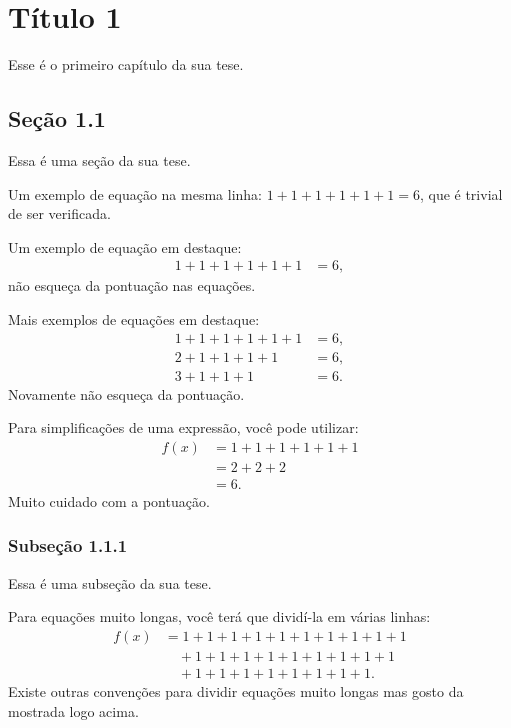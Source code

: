 \chapter{T\'itulo 1}
Esse \'e o primeiro cap\'itulo da sua tese.

\section{Se\c c\~ao 1.1}
Essa \'{e} uma se\c{c}\~{a}o da sua tese.

Um exemplo de equa\c{c}\~{a}o na mesma linha: 
$ 1 + 1 + 1 + 1 + 1 + 1 = 6$, 
que \'{e} trivial de ser verificada.

Um exemplo de equa\c{c}\~{a}o em destaque:
\begin{align*}
1 + 1 + 1 + 1 + 1 + 1 &= 6,
\end{align*}
n\~{a}o esque\c{c}a da pontua\c{c}\~{a}o nas equa\c{c}\~{o}es.

Mais exemplos de equa\c{c}\~{o}es em destaque:
\begin{align*}
1 + 1 + 1 + 1 + 1 + 1 &= 6, \\
2 + 1 + 1 + 1 + 1 &= 6, \\
3 + 1 + 1 + 1 &= 6.
\end{align*}
Novamente n\~{a}o esque\c{c}a da pontua\c{c}\~{a}o.

Para simplifica\c{c}\~{o}es de uma express\~{a}o, voc\^{e} pode utilizar:
\begin{align*}
    f(x) &= 1 + 1 + 1 + 1 + 1 + 1 \\
    &= 2 + 2 + 2 \\
    &= 6.
\end{align*}
Muito cuidado com a pontua\c{c}\~{a}o.

\subsection{Subse\c c\~ao 1.1.1}
Essa \'{e} uma subse\c{c}\~{a}o da sua tese.

Para equa\c{c}\~{o}es muito longas, voc\^{e} terá que dividí-la em várias linhas:
\begin{align*}
    f(x) &= 1 + 1 + 1 + 1 + 1 + 1 + 1 + 1 + 1 + 1 \\
    &\quad {}+ 1 + 1 + 1 + 1 + 1 + 1 + 1 + 1 + 1 \\
    &\quad {}+ 1 + 1 + 1 + 1 + 1 + 1 + 1 + 1.
\end{align*}
Existe outras conven\c{c}\~{o}es para dividir equa\c{c}\~{o}es muito longas mas gosto da
mostrada logo acima.

